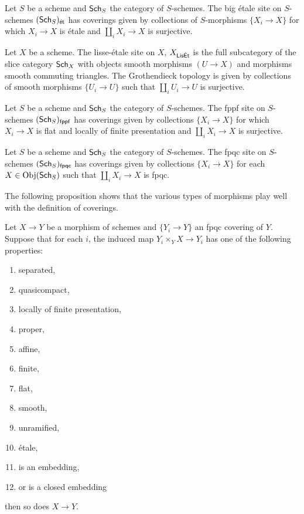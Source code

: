 \begin{definition}\label{def: big etale site}
    Let $S$ be a scheme and $\mathsf{Sch}_{S}$ the category of $S$-schemes. The big \'{e}tale site on $S$-schemes $(\mathsf{Sch}_{S})_{\mathsf{\acute{e}t}}$ has coverings given by collections of $S$-morphisms $\{X_{i}\to X\}$ for which $X_{i}\to X$ is \'{e}tale and $\coprod_{i}X_{i}\to X$ is surjective. 
\end{definition}
\begin{definition}\label{def: lisse etale site}
    Let $X$ be a scheme. The lisse-\'{e}tale site on $X$, $X_{\mathsf{Lis\acute{E}t}}$ is the full subcategory of the slice category $\mathsf{Sch}_{X}$ with objects smooth morphisms $(U\to X)$ and morphisms smooth commuting triangles. The Grothendieck topology is given by collections of smooth morphisms $\{U_{i}\to U\}$ such that $\coprod_{i}U_{i}\to U$ is surjective. 
\end{definition}
\begin{definition}\label{def: fppf site}
    Let $S$ be a scheme and $\mathsf{Sch}_{S}$ the category of $S$-schemes. The fppf site on $S$-schemes $(\mathsf{Sch}_{S})_{\mathsf{fppf}}$ has coverings given by collections $\{X_{i}\to X\}$ for which $X_{i}\to X$ is flat and locally of finite presentation and $\coprod_{i}X_{i}\to X$ is surjective. 
\end{definition}
\begin{definition}\label{def: fpqc site}
    Let $S$ be a scheme and $\mathsf{Sch}_{S}$ the category of $S$-schemes. The fpqc site on $S$-schemes $(\mathsf{Sch}_{S})_{\mathsf{fpqc}}$ has coverings given by collections $\{X_{i}\to X\}$ for each $X\in\mathrm{Obj}(\mathsf{Sch}_{S})$ such that $\coprod_{i}X_{i}\to X$ is fpqc. 
\end{definition}
The following proposition shows that the various types of morphisms play well with the definition of coverings. 
\begin{proposition}
    Let $X\to Y$ be a morphism of schemes and $\{Y_{i}\to Y\}$ an fpqc covering of $Y$. Suppose that for each $i$, the induced map $Y_{i}\times_{Y}X\to Y_{i}$ has one of the following properties: 
    \begin{enumerate}[label=(\alph*)]
        \item separated, 
        \item quasicompact, 
        \item locally of finite presentation, 
        \item proper, 
        \item affine, 
        \item finite, 
        \item flat, 
        \item smooth, 
        \item unramified, 
        \item \'{e}tale,
        \item is an embedding, 
        \item or is a closed embedding
    \end{enumerate}
    then so does $X\to Y$. 
\end{proposition}
